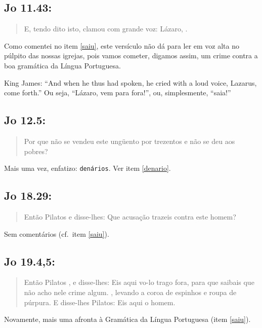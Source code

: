 \subsection*{Jo 11.43:}
\begin{quote}
    \small
E, tendo dito isto, clamou com grande voz: Lázaro, .
\end{quote}

Como comentei no item \ref{saiu}, este versículo não dá para ler em voz alta no púlpito das nossas igrejas, pois vamos cometer, digamos assim, um crime contra a boa gramática da Língua Portuguesa.

King James: ``And when he thus had spoken, he cried with a loud voice,
Lazarus, come forth.'' Ou seja, ``Lázaro, vem para fora!'', ou, simplesmente, ``saia!''


\subsection*{Jo 12.5:} 
\begin{quote}
    \small
Por que não se vendeu este ungüento por trezentos  e não se deu aos pobres?
\end{quote}

Mais uma vez, enfatizo: \texttt{denários}. Ver item \ref{denario}.


\subsection*{Jo 18.29:} 
\begin{quote}
    \small
Então Pilatos  e disse-lhes: Que acusação
trazeis contra este homem?
\end{quote}

Sem comentários (cf.~item \ref{saiu}).

\subsection*{Jo 19.4,5:}
\begin{quote}
    \small
Então Pilatos , e disse-lhes: Eis aqui vo-lo trago fora, para que saibais que não acho nele crime algum. , levando a coroa de espinhos e roupa de púrpura. E disse-lhes Pilatos: Eis aqui o homem.
\end{quote}

Novamente, mais uma afronta à Gra\-má\-tica da Lín\-gua Por\-tu\-gue\-sa (i\-tem \ref{saiu}).

